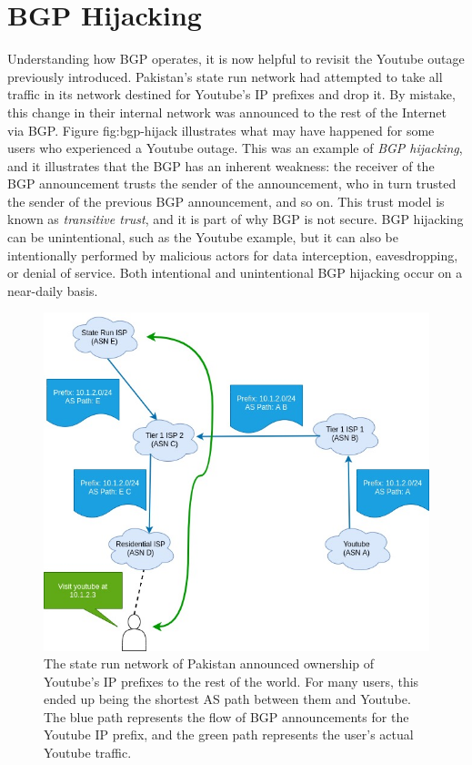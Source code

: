 \documentclass[conference]{IEEEtran}
\begin{document}
\section{BGP Hijacking}
Understanding how BGP operates, it is now helpful to revisit the Youtube outage previously introduced.  Pakistan's state run network had attempted to take all traffic in its network destined for Youtube's IP prefixes and drop it.  By mistake, this change in their internal network was announced to the rest of the Internet via BGP.  Figure {fig:bgp-hijack} illustrates what may have happened for some users who experienced a Youtube outage.  This was an example of \emph{BGP hijacking}, and it illustrates that the BGP has an inherent weakness: the receiver of the BGP announcement trusts the sender of the announcement, who in turn trusted the sender of the previous BGP announcement, and so on.  This trust model is known as \emph{transitive trust}, and it is part of why BGP is not secure.  BGP hijacking can be unintentional, such as the Youtube example, but it can also be intentionally performed by malicious actors for data interception, eavesdropping, or denial of service.  Both intentional and unintentional BGP hijacking occur on a near-daily basis\cite{b1}.

\begin{figure}[ht]
  \includegraphics[width=\linewidth]{images/bgp-hijack.jpg}
  \caption{The state run network of Pakistan announced ownership of Youtube's IP prefixes to the rest of the world.  For many users, this ended up being the shortest AS path between them and Youtube.  The blue path represents the flow of BGP announcements for the Youtube IP prefix, and the green path represents the user's actual Youtube traffic.}
  \label{fig:bgp-hijack}
\end{figure}
\end{document}
